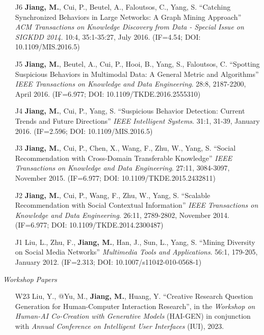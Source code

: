 \documentclass[10pt]{article}
\newenvironment{myindentpar}[1]%
{\begin{list}{}%
         {\setlength{\leftmargin}{#1}}%
         \item[]%
}
{\end{list}}
\newcounter{list}
\begin{document}
\begin{myindentpar}{0.00cm}
\begin{enumerate}[leftmargin=.5cm]
\item[J6] \textbf{Jiang, M.}, Cui, P., Beutel, A., Faloutsos, C., Yang, S. ``Catching Synchronized Behaviors in Large Networks: A Graph Mining Approach'' \textit{ACM Transactions on Knowledge Discovery from Data - Special Issue on SIGKDD 2014}. 10:4, 35:1-35:27, July 2016. (IF=4.54; DOI: 10.1109/MIS.2016.5)

\item[J5] \textbf{Jiang, M.}, Beutel, A., Cui, P., Hooi, B., Yang, S., Faloutsos, C. ``Spotting Suspicious Behaviors in Multimodal Data: A General Metric and Algorithms'' \textit{IEEE Transactions on Knowledge and Data Engineering}. 28:8, 2187-2200, April 2016. (IF=6.977; DOI: 10.1109/TKDE.2016.2555310)

\item[J4] \textbf{Jiang, M.}, Cui, P., Yang, S. ``Suspicious Behavior Detection: Current Trends and Future Directions'' \textit{IEEE Intelligent Systems}. 31:1, 31-39, January 2016. (IF=2.596; DOI: 10.1109/MIS.2016.5)

\item[J3] \textbf{Jiang, M.}, Cui, P., Chen, X., Wang, F., Zhu, W., Yang, S. ``Social Recommendation with Cross-Domain Transferable Knowledge'' \textit{IEEE Transactions on Knowledge and Data Engineering}. 27:11, 3084-3097, November 2015. (IF=6.977; DOI: 10.1109/TKDE.2015.2432811)

\item[J2] \textbf{Jiang, M.}, Cui, P., Wang, F., Zhu, W., Yang, S. ``Scalable Recommendation with Social Contextual Information'' \textit{IEEE Transactions on Knowledge and Data Engineering}. 26:11, 2789-2802, November 2014. (IF=6.977; DOI: 10.1109/TKDE.2014.2300487)

\item[J1] Liu, L., Zhu, F., \textbf{Jiang, M.}, Han, J., Sun, L., Yang, S. ``Mining Diversity on Social Media Networks'' \textit{Multimedia Tools and Applications}. 56:1, 179-205, January 2012. (IF=2.313; DOI: 10.1007/s11042-010-0568-1)

\end{enumerate}

\hspace{-0.25cm}\textit{Workshop Papers}

\begin{enumerate}[leftmargin=.5cm]
		
\item[W23] Liu, Y., @Yu, M., \textbf{Jiang, M.}, Huang, Y. ``Creative Research Question Generation for Human-Computer Interaction Research'', in the \textit{Workshop on Human-AI Co-Creation with Generative Models} (HAI-GEN) in conjunction with \textit{Annual Conference on Intelligent User Interfaces} (IUI), 2023.


\end{enumerate}
\end{myindentpar}
\end{document}
